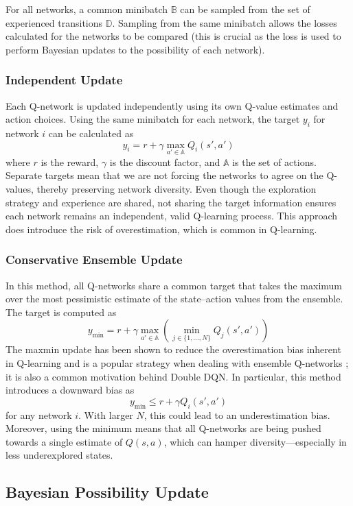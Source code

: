 \documentclass[12pt,a4paper]{report}
\begin{document}
For all networks, a common minibatch \(\mathbb{B}\) can be sampled from the set of experienced transitions \(\mathbb{D}\). Sampling from the same minibatch allows the losses calculated for the networks to be compared (this is crucial as the loss is used to perform Bayesian updates to the possibility of each network).

\subsubsection{Independent Update}
Each Q-network is updated independently using its own Q-value estimates and action choices. Using the same minibatch for each network, the target \(y_i\) for network \(i\) can be calculated as 
\[
  y_i = r + \gamma \max_{a' \in \mathbb{A}} Q_i(s', a')
\]
where \(r\) is the reward, \(\gamma\) is the discount factor, and \(\mathbb{A}\) is the set of actions. Separate targets mean that we are not forcing the networks to agree on the Q-values, thereby preserving network diversity. Even though the exploration strategy and experience are shared, not sharing the target information ensures each network remains an independent, valid Q-learning process. This approach does introduce the risk of overestimation, which is common in Q-learning.

\subsubsection{Conservative Ensemble Update}
In this method, all Q-networks share a common target that takes the maximum over the most pessimistic estimate of the state–action values from the ensemble. The target is computed as
\[
  y_{\min} = r + \gamma \max_{a' \in \mathbb{A}} \left( \min_{j \in \{1, \dots, N\}} Q_j(s', a') \right)
\]
The maxmin update has been shown to reduce the overestimation bias inherent in Q-learning and is a popular strategy when dealing with ensemble Q-networks \cite{lan2021maxminq}; it is also a common motivation behind Double DQN. In particular, this method introduces a downward bias as
\[
  y_{\min} \le r + \gamma Q_i(s', a')
\]
for any network \(i\). With larger \(N\), this could lead to an underestimation bias. Moreover, using the minimum means that all Q-networks are being pushed towards a single estimate of \(Q(s,a)\), which can hamper diversity—especially in less underexplored states.

\subsection{Bayesian Possibility Update}
\end{document}
